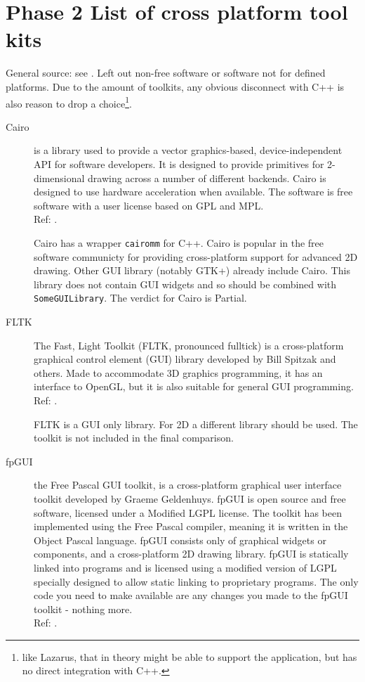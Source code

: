 \section{Phase 2 List of cross platform tool kits}

General source: see \cite{wiki:xplatf}. Left out non-free software or software
not for defined platforms. Due to the amount of toolkits, any obvious
disconnect with C++ is also reason to drop a choice\footnote{like Lazarus, that
in theory might be able to support the application, but has no direct
integration with C++.}.

\begin{description}
    \item[Cairo] is a library used to provide a vector graphics-based,
		device-independent API for software developers. It is designed
		to provide primitives for 2-dimensional drawing across a number
		of different backends. Cairo is designed to use hardware
		acceleration when available.
		The software is free software with a user license based on GPL
		and MPL.
		\hspace*{\fill}\\Ref: \cite{wiki:cairo}.

		Cairo has a wrapper \verb!cairomm! for C++.  Cairo is popular in the
		free software communicty for providing cross-platform support for
		advanced 2D drawing. Other GUI library (notably GTK+) already include
		Cairo. This library does not contain GUI widgets and so should be
		combined with \verb!SomeGUILibrary!. The verdict for Cairo is Partial.

    \item[FLTK] The Fast, Light Toolkit (FLTK, pronounced fulltick) is a
		cross-platform graphical control element (GUI)
		library developed by Bill Spitzak and others. Made to
		accommodate 3D graphics programming, it has an interface to
		OpenGL, but it is also suitable for general GUI programming.
		\hspace*{\fill}\\Ref: \cite{wiki:fltk}.

		FLTK is a GUI only library. For 2D a different library should be used.
		The toolkit is not included in the final comparison.

    \item[fpGUI] the Free Pascal GUI toolkit, is a cross-platform
		graphical user interface toolkit developed by Graeme Geldenhuys.
		fpGUI is open source and free software, licensed under a Modified LGPL
		license. The toolkit has been implemented using the Free Pascal
		compiler, meaning it is written in the Object Pascal language.
		fpGUI consists only of graphical widgets or components, and a
		cross-platform 2D drawing library.
		fpGUI is statically linked into programs and is licensed using a
		modified version of LGPL specially designed to allow static linking to
		proprietary programs. The only code you need to make available are
		any changes you made to the fpGUI toolkit - nothing more.
		\hspace*{\fill}\\Ref: \cite{wiki:fpgui}.


\end{description}
